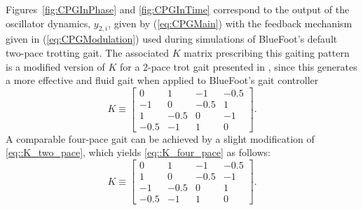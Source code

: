 			Figures~\ref{fig:CPGInPhase} and \ref{fig:CPGInTime} correspond to the output of the oscillator dynamics, $y_{2,i}$, given by (\ref{eq:CPGMain}) with the feedback mechanism given in (\ref{eq:CPGModulation})  used during simulations of BlueFoot's default two-pace trotting gait. The associated $K$ matrix prescribing this gaiting pattern is a modified version of $K$ for a 2-pace trot gait presented in \cite{Rutishauser2008}, since this generates a more effective and fluid gait when applied to BlueFoot's gait controller
				\begin{equation}
						K\equiv 
						\left[ 
						\begin{array}{cccc}
						 0	   	&	 1   	&	 	-1   	&		-0.5\\
						-1	   	&	 0   	&	 	-0.5   	&		 1 	\\
						 1    	&	-0.5   	&		0    	&	 	-1 	\\
						-0.5	&	-1   	&		1    	&		 0
						\end{array}
						\right].
						\label{eq::K_two_pace}
				\end{equation}
			A comparable four-pace gait can be achieved by a slight modification of \ref{eq::K_two_pace}, which yields \ref{eq::K_four_pace} as follows:
				\begin{equation}
						K\equiv 
						\left[ 
						\begin{array}{cccc}
						 0	   	&	 1   	&	 	-1   	&		-0.5\\
						 1	   	&	 0   	&	 	-0.5   	&		-1 	\\
						-1    	&	-0.5   	&		0    	&	 	 1 	\\
						-0.5	&	-1   	&		1    	&		 0
						\end{array}
						\right].
						\label{eq::K_four_pace}
				\end{equation}

